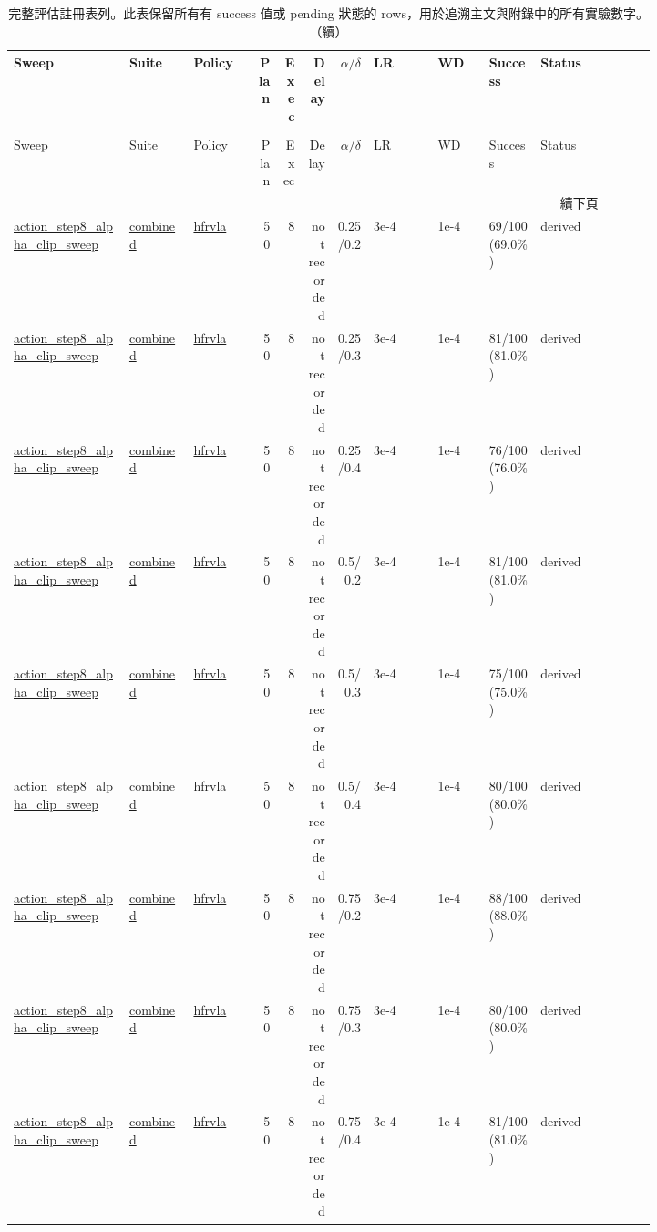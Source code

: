 \begin{tiny}
\begin{longtable}{@{}p{0.18\linewidth}p{0.10\linewidth}p{0.10\linewidth}rrrrp{0.10\linewidth}p{0.08\linewidth}p{0.08\linewidth}p{0.11\linewidth}p{0.07\linewidth}@{}}
\caption{完整評估註冊表列。此表保留所有有 success 值或 pending 狀態的 rows，用於追溯主文與附錄中的所有實驗數字。}\label{tab:full-eval-registry}\\
\toprule
Sweep & Suite & Policy & Plan & Exec & Delay & $\alpha/\delta$ & LR & WD & Success & Status \\
\midrule
\endfirsthead
\caption[]{完整評估註冊表列。此表保留所有有 success 值或 pending 狀態的 rows，用於追溯主文與附錄中的所有實驗數字。（續）}\\
\toprule
Sweep & Suite & Policy & Plan & Exec & Delay & $\alpha/\delta$ & LR & WD & Success & Status \\
\midrule
\endhead
\midrule
\multicolumn{11}{r}{續下頁}\\
\endfoot
\bottomrule
\endlastfoot
\url{action_step8_alpha_clip_sweep} & \url{combined} & \url{hfrvla} & 50 & 8 & not recorded & 0.25/0.2 & 3e-4 & 1e-4 & 69/100 (69.0\%) & derived \\
\url{action_step8_alpha_clip_sweep} & \url{combined} & \url{hfrvla} & 50 & 8 & not recorded & 0.25/0.3 & 3e-4 & 1e-4 & 81/100 (81.0\%) & derived \\
\url{action_step8_alpha_clip_sweep} & \url{combined} & \url{hfrvla} & 50 & 8 & not recorded & 0.25/0.4 & 3e-4 & 1e-4 & 76/100 (76.0\%) & derived \\
\url{action_step8_alpha_clip_sweep} & \url{combined} & \url{hfrvla} & 50 & 8 & not recorded & 0.5/0.2 & 3e-4 & 1e-4 & 81/100 (81.0\%) & derived \\
\url{action_step8_alpha_clip_sweep} & \url{combined} & \url{hfrvla} & 50 & 8 & not recorded & 0.5/0.3 & 3e-4 & 1e-4 & 75/100 (75.0\%) & derived \\
\url{action_step8_alpha_clip_sweep} & \url{combined} & \url{hfrvla} & 50 & 8 & not recorded & 0.5/0.4 & 3e-4 & 1e-4 & 80/100 (80.0\%) & derived \\
\url{action_step8_alpha_clip_sweep} & \url{combined} & \url{hfrvla} & 50 & 8 & not recorded & 0.75/0.2 & 3e-4 & 1e-4 & 88/100 (88.0\%) & derived \\
\url{action_step8_alpha_clip_sweep} & \url{combined} & \url{hfrvla} & 50 & 8 & not recorded & 0.75/0.3 & 3e-4 & 1e-4 & 80/100 (80.0\%) & derived \\
\url{action_step8_alpha_clip_sweep} & \url{combined} & \url{hfrvla} & 50 & 8 & not recorded & 0.75/0.4 & 3e-4 & 1e-4 & 81/100 (81.0\%) & derived \\

\end{longtable}
\end{tiny}
